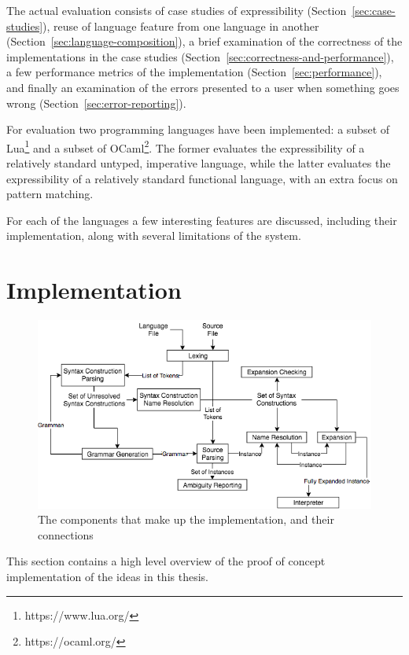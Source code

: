 \documentclass{kththesis}
\begin{document}
The actual evaluation consists of case studies of expressibility (Section~\ref{sec:case-studies}), reuse of language feature from one language in another (Section~\ref{sec:language-composition}), a brief examination of the correctness of the implementations in the case studies (Section~\ref{sec:correctness-and-performance}), a few performance metrics of the implementation (Section~\ref{sec:performance}), and finally an examination of the errors presented to a user when something goes wrong (Section~\ref{sec:error-reporting}).

For evaluation two programming languages have been implemented: a subset of Lua\footnote{https://www.lua.org/} and a subset of OCaml\footnote{https://ocaml.org/}. The former evaluates the expressibility of a relatively standard untyped, imperative language, while the latter evaluates the expressibility of  a relatively standard functional language, with an extra focus on pattern matching.

For each of the languages a few interesting features are discussed, including their implementation, along with several limitations of the system.

\section{Implementation} \label{sec:implementation}

\begin{figure}[t]
\includegraphics[width=\textwidth]{resources/implementation-flowchart}
\caption{The components that make up the implementation, and their connections}
\label{fig:implementation-flowchart}
\end{figure}

This section contains a high level overview of the proof of concept implementation of the ideas in this thesis.
\end{document}
